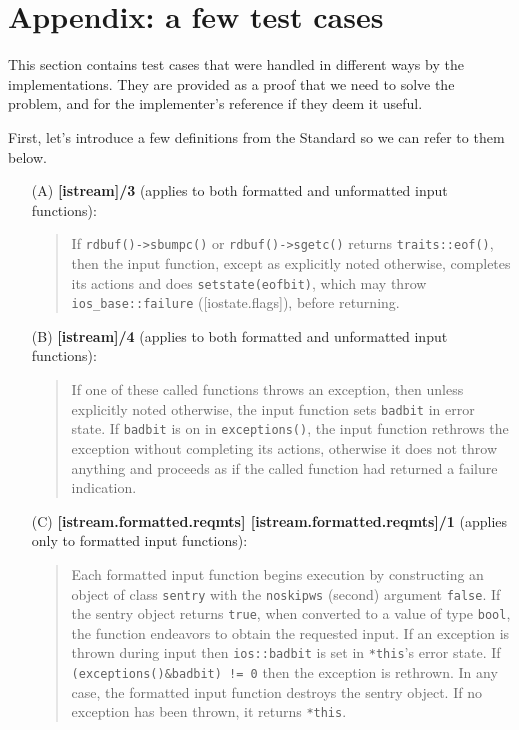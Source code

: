 \documentclass{wg21}
\newcommand{\cc}[1]{\texttt{#1}}
\begin{document}
\section{Appendix: a few test cases}
This section contains test cases that were handled in different ways by the
implementations. They are provided as a proof that we need to solve the problem,
and for the implementer's reference if they deem it useful.

First, let's introduce a few definitions from the Standard so we can refer to
them below.

\begin{enumerate}
  \item[(A)] \textbf{[istream]/3} (applies to both formatted and unformatted input functions):
  \begin{quote}
  If \cc{rdbuf()->sbumpc()} or \cc{rdbuf()->sgetc()} returns \cc{traits::eof()},
  then the input function, except as explicitly noted otherwise, completes its
  actions and does \cc{setstate(eofbit)}, which may throw \cc{ios_base::failure}
  ([iostate.flags]), before returning.
  \end{quote}

  \item[(B)] \textbf{[istream]/4} (applies to both formatted and unformatted input functions):
  \begin{quote}
  If one of these called functions throws an exception, then unless explicitly
  noted otherwise, the input function sets \cc{badbit} in error state. If
  \cc{badbit} is on in \cc{exceptions()}, the input function rethrows the
  exception without completing its actions, otherwise it does not throw
  anything and proceeds as if the called function had returned a failure
  indication.
  \end{quote}

  \item[(C)] \textbf{[istream.formatted.reqmts] [istream.formatted.reqmts]/1} (applies only to formatted input functions):
  \begin{quote}
  Each formatted input function begins execution by constructing an object of
  class \cc{sentry} with the \cc{noskipws} (second) argument \cc{false}. If
  the sentry object returns \cc{true}, when converted to a value of type
  \cc{bool}, the function endeavors to obtain the requested input. If an exception
  is thrown during input then \cc{ios::badbit} is set in \cc{*this}'s error
  state. If \cc{(exceptions()&badbit) != 0} then the exception is rethrown. In
  any case, the formatted input function destroys the sentry object. If no
  exception has been thrown, it returns \cc{*this}.
  \end{quote}


\end{enumerate}
\end{document}
